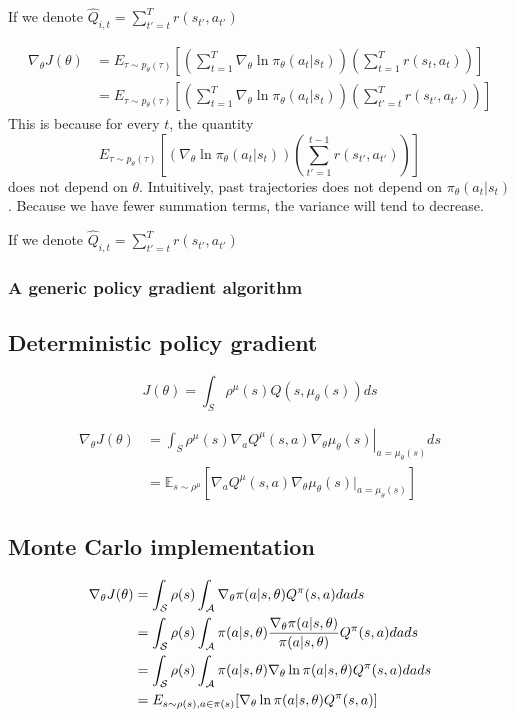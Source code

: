 \begin{refsection}
\begin{remark}
	If we denote $\hat{Q}_{i,t} = \sum_{t'=t}^T r(s_{t'},a_{t'})$
\end{remark}


\begin{remark}
	\begin{align*}
	\nabla_{\theta}J(\theta) &= E_{\tau\sim p_\theta(\tau)}[(\sum_{t=1}^T \nabla_{\theta} \ln \pi_{\theta}(a_t|s_t))(\sum_{t=1}^{T}r(s_t,a_t))] \\
	&= E_{\tau\sim p_\theta(\tau)}[(\sum_{t=1}^T \nabla_{\theta} \ln \pi_{\theta}(a_t|s_t))(\sum_{t'=t}^{T}r(s_{t'},a_{t'}))] 
	\end{align*}	
	This is because for every $t$, the quantity
	$$E_{\tau\sim p_\theta(\tau)}[( \nabla_{\theta} \ln \pi_{\theta}(a_t|s_t))(\sum_{t'=1}^{t-1}r(s_{t'},a_{t'}))]$$
	does not depend on $\theta$. Intuitively, past trajectories does not depend on $\pi_\theta(a_t|s_t)$. Because we have fewer summation terms, the variance will tend to decrease. 
	
	If we denote $\hat{Q}_{i,t} = \sum_{t'=t}^T r(s_{t'},a_{t'})$
\end{remark}
\subsubsection{A generic policy gradient algorithm}






\subsection{Deterministic policy gradient}


$$J(\theta)=\int_{S} \rho^{\mu}(s) Q\left(s, \mu_{\theta}(s)\right) d s$$

\begin{align*} 
\nabla_{\theta} J(\theta) &=\left.\int_{S} \rho^{\mu}(s) \nabla_{a} Q^{\mu}(s, a) \nabla_{\theta} \mu_{\theta}(s)\right|_{a=\mu_{\theta}(s)} d s \\
\
&=\mathbb{E}_{s \sim \rho^{\mu}}[ \nabla_{a} Q^{\mu}(s, a) \nabla_{\theta} \mu_{\theta}(s)|_{a=\mu_{\theta}(s)}] 
\end{align*}

\subsection{Monte Carlo implementation} 


\begin{align*}
\nabla_{\theta} J(\theta) &= \int_{\mathcal{S}}\rho(s)\int_{\mathcal{A}}\nabla_{\theta}\pi(a|s,\theta)Q^\pi(s,a)dads \\
&= \int_{\mathcal{S}}\rho(s)\int_{\mathcal{A}}\pi(a|s,\theta)\frac{\nabla_{\theta}\pi(a|s,\theta)}{\pi(a|s,\theta)}Q^\pi(s,a)dads \\
&= \int_{\mathcal{S}}\rho(s)\int_{\mathcal{A}}\pi(a|s,\theta)\nabla_{\theta}\ln \pi(a|s,\theta)Q^\pi(s,a)dads \\
&= E_{s\sim \rho(s),a\in\pi(s)}[\nabla_{\theta}\ln \pi(a|s,\theta)Q^\pi(s,a)] 
\end{align*}




\end{refsection}
